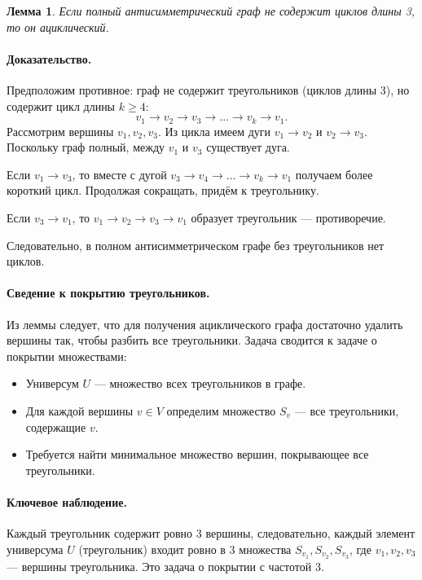 \documentclass[12pt]{article}
\newtheorem{lemma}{Лемма}
\begin{document}
  \begin{lemma}
  Если полный антисимметрический граф не содержит циклов длины 3, то он ациклический.
  \end{lemma}

  \paragraph{Доказательство.}
  Предположим противное: граф не содержит треугольников (циклов длины 3), но содержит цикл длины \(k \geq 4\):
  \[
  v_1 \to v_2 \to v_3 \to \ldots \to v_k \to v_1.
  \]
  Рассмотрим вершины \(v_1, v_2, v_3\). Из цикла имеем дуги \(v_1 \to v_2\) и \(v_2 \to v_3\). Поскольку граф полный, между \(v_1\) и \(v_3\) существует дуга.

  Если \(v_1 \to v_3\), то вместе с дугой \(v_3 \to v_4 \to \ldots \to v_k \to v_1\) получаем более короткий цикл. Продолжая сокращать, придём к треугольнику.

  Если \(v_3 \to v_1\), то \(v_1 \to v_2 \to v_3 \to v_1\) образует треугольник — противоречие.

  Следовательно, в полном антисимметрическом графе без треугольников нет циклов.

  \paragraph{Сведение к покрытию треугольников.}
  Из леммы следует, что для получения ациклического графа достаточно удалить вершины так, чтобы разбить все треугольники. Задача сводится к задаче о покрытии множествами:
  \begin{itemize}
    \item Универсум \(U\) — множество всех треугольников в графе.
    \item Для каждой вершины \(v \in V\) определим множество \(S_v\) — все треугольники, содержащие \(v\).
    \item Требуется найти минимальное множество вершин, покрывающее все треугольники.
  \end{itemize}

  \paragraph{Ключевое наблюдение.}
  Каждый треугольник содержит ровно 3 вершины, следовательно, каждый элемент универсума \(U\) (треугольник) входит ровно в 3 множества \(S_{v_1}, S_{v_2}, S_{v_3}\), где \(v_1, v_2, v_3\) — вершины треугольника. Это задача о покрытии с частотой 3.
\end{document}
